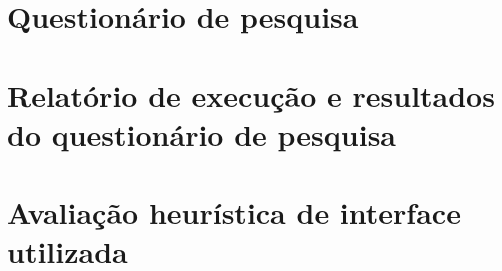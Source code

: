 \begin{apendicesenv}

\partapendices

\chapter{Questionário de pesquisa}



\chapter{Relatório de execução e resultados do questionário de pesquisa}



\chapter{Avaliação heurística de interface utilizada}



\end{apendicesenv}